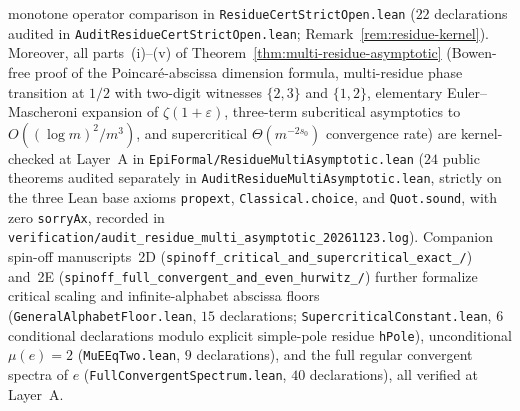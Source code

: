 monotone operator comparison in \texttt{Residue\allowbreak Cert\allowbreak StrictOpen.lean} ($22$ declarations audited in \texttt{AuditResidueCertStrictOpen.lean}; Remark~\ref{rem:residue-kernel}). Moreover, all parts~(i)--(v) of Theorem~\ref{thm:multi-residue-asymptotic} (Bowen-free proof of the Poincar\'e-abscissa dimension formula, multi-residue phase transition at $1/2$ with two-digit witnesses $\{2,3\}$ and $\{1,2\}$, elementary Euler--Mascheroni expansion of $\zeta(1+\varepsilon)$, three-term subcritical asymptotics to $O((\log m)^2/m^3)$, and supercritical $\Theta(m^{-2s_0})$ convergence rate) are kernel-checked at Layer~A in \texttt{EpiFormal/\allowbreak ResidueMultiAsymptotic.lean} ($24$ public theorems audited separately in \texttt{AuditResidueMultiAsymptotic.lean}, strictly on the three Lean base axioms \texttt{propext}, \texttt{Classical.choice}, and \texttt{Quot.sound}, with zero \texttt{sorryAx}, recorded in \texttt{verification/\allowbreak audit\_\allowbreak residue\_\allowbreak multi\_\allowbreak asymptotic\_\allowbreak 20261123.log}). Companion spin-off manuscripts~2D (\texttt{spinoff\_\allowbreak critical\_\allowbreak and\_\allowbreak supercritical\_\allowbreak exact\_/}) and~2E (\texttt{spinoff\_\allowbreak full\_\allowbreak convergent\_\allowbreak and\_\allowbreak even\_\allowbreak hurwitz\_/}) further formalize critical scaling and infinite-alphabet abscissa floors (\texttt{GeneralAlphabetFloor.lean}, $15$ declarations; \texttt{SupercriticalConstant.lean}, $6$ conditional declarations modulo explicit simple-pole residue \texttt{hPole}), unconditional $\mu(e)=2$ (\texttt{MuEEqTwo.lean}, $9$ declarations), and the full regular convergent spectra of $e$ (\texttt{FullConvergentSpectrum.lean}, $40$ declarations), all verified at Layer~A.

